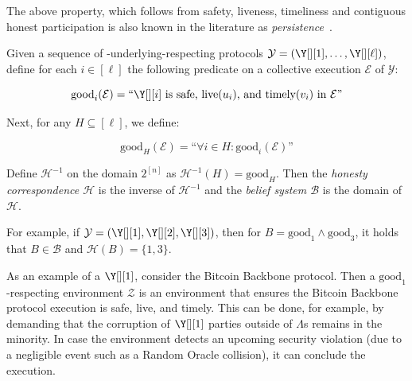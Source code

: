 The above property, which follows from safety, liveness, timeliness and
contiguous honest participation is also known in the literature as
\emph{persistence}~\cite{backbone}.

\begin{definition}
  Given a sequence of \rollerblade-underlying-respecting
  protocols $\mathcal{Y} = (\Y[][1], \ldots, \Y[][\ell])$,
  define for each $i \in [\ell]$ the following predicate on
  a collective execution $\mathcal{E}$ of $\mathcal{Y}$:

  \[
    \text{good}_i(\mathcal{E}) = \text{``} \Y[][i] \text{ is safe, live$(u_i)$, and timely$(v_i)$ in $\mathcal{E}$''}
  \]

  Next, for any $H \subseteq [\ell]$, we define:

  \[
    \text{good}_H(\mathcal{E}) = \text{``}\forall i \in H: \text{good}_i(\mathcal{E})\text{''}
  \]

  Define $\mathcal{H}^{-1}$ on the domain $2^{[n]}$ as
  $\mathcal{H}^{-1}(H) = \text{good}_H$.
  Then the \emph{\rollerblade honesty correspondence $\mathcal{H}$}
  is the inverse of $\mathcal{H}^{-1}$ and the \emph{\rollerblade belief system
  $\mathcal{B}$} is the domain of $\mathcal{H}$.
\end{definition}

For example, if $\mathcal{Y} = (\Y[][1], \Y[][2], \Y[][3])$,
then for $B = \text{good}_1 \land \text{good}_3$, it holds that
$B \in \mathcal{B}$ and $\mathcal{H}(B) = \{1, 3\}$.

As an example of a $\Y[][1]$, consider the Bitcoin Backbone protocol.
Then a $\text{good}_1$-respecting environment $\mathcal{Z}$ is an environment
that ensures the Bitcoin Backbone protocol execution is safe, live, and timely.
This can be done, for example, by demanding that the corruption of $\Y[][1]$
parties outside of $\Lambda$s remains in the minority. In case the environment
detects an upcoming security violation (due to a negligible event such as a
Random Oracle collision), it can conclude the execution.

